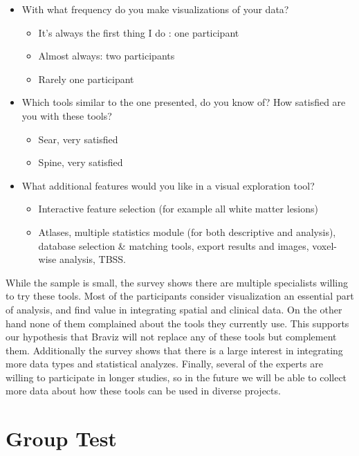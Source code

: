 \begin{itemize}
	\item With what frequency do you make visualizations of your data?
	\begin{itemize}
		\item It's always the first thing I do : one participant
		\item Almost always: two participants
		\item Rarely one participant
	\end{itemize}
	\item Which tools similar to the one presented, do you know of? How satisfied are you with these tools?
	\begin{itemize}
		\item Sear, very satisfied
		\item Spine, very satisfied
	\end{itemize}
	\item What additional features would you  like in a visual exploration tool?
	\begin{itemize}
		\item Interactive feature selection (for example all white matter lesions)
		\item Atlases, multiple statistics module (for both descriptive and analysis), database selection \& matching tools, export results and images, voxel-wise analysis, TBSS.
	\end{itemize}	
\end{itemize}

\smallskip

While the sample is small, the survey shows there are multiple specialists willing to try these tools. Most of the participants consider visualization an essential part of analysis, and find value in integrating spatial and clinical data. On the other hand none of them complained about the tools they currently use. This supports our hypothesis that Braviz will not replace any of these tools but complement them. Additionally the survey shows that there is a large interest in integrating more data types and statistical analyzes. Finally, several of the experts are willing to participate in longer studies, so in the future we will be able to collect more data about how these tools can be used in diverse projects.


\section{Group Test}

